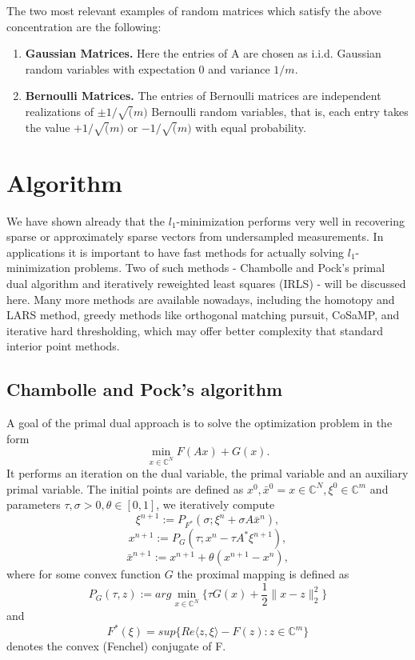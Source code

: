 \documentclass[
  english,        %
  font=times,     %
  onecolumn,      %
]{tumarticle}
\numberwithin{equation}{section} %
\begin{document}
\begin{large}
\begin{adjustwidth}{0pt}{0pt}
The two most relevant examples of random matrices which satisfy the above concentration are the following:
\begin{enumerate}
\item \textbf{Gaussian Matrices.} Here the entries of A are chosen as i.i.d. Gaussian random variables with expectation 0 and variance $1/m$.
\item \textbf{Bernoulli Matrices.} The entries of Bernoulli matrices are independent realizations of $\pm 1 / \sqrt(m)$ Bernoulli random variables, that is, each entry takes the value $+1 / \sqrt(m)$ or $-1 / \sqrt(m)$ with equal probability.
\end{enumerate}


\section{Algorithm}

We have shown already that the $l_1$-minimization performs very well in recovering sparse or approximately sparse vectors from undersampled measurements. In applications it is important to have fast methods for actually solving $l_1$-minimization problems. Two of such methods - Chambolle and Pock's primal dual algorithm and iteratively reweighted least squares (IRLS) - will be discussed here. Many more methods are available nowadays, including the homotopy and LARS method, greedy methods like orthogonal matching pursuit, CoSaMP, and iterative hard thresholding, which may offer better complexity that standard interior point methods.

\subsection{Chambolle and Pock's algorithm}

A goal of the primal dual approach is to solve the optimization problem in the form
\begin{equation}
    \min_{x \in \mathbb{C}^N} F(Ax) + G(x).
\end{equation}
It performs an iteration on the dual variable, the primal variable and an auxiliary primal variable. The initial points are defined as $x^0, \bar{x}^0 = x \in \mathbb{C}^N, \xi^0 \in \mathbb{C}^m$ and parameters $\tau, \sigma > 0, \theta \in [0,1]$, we iteratively compute
\begin{equation}
    \xi^{n+1} := P_{F^*}(\sigma;\xi^n + \sigma A \bar{x}^n),
\end{equation}
\begin{equation}
    x^{n+1} := P_G(\tau; x^n - \tau A^* \xi^{n+1}),
\end{equation}
\begin{equation}
    \bar{x}^{n+1} := x^{n+1} + \theta (x^{n+1} - x^n),
\end{equation}
where for some convex function $G$ the proximal mapping is defined as
\[ P_G(\tau, z) := arg \min_{x \in \mathbb{C}^N} \{\tau G(x) + \frac{1}{2} \lVert x - z \rVert_2^2\} \]
and
\[ F^*(\xi) = sup \{ Re\langle z,\xi \rangle - F(z) : z \in \mathbb{C}^m \} \]
denotes the convex (Fenchel) conjugate of F.


\end{adjustwidth}
\end{large}
\end{document}
